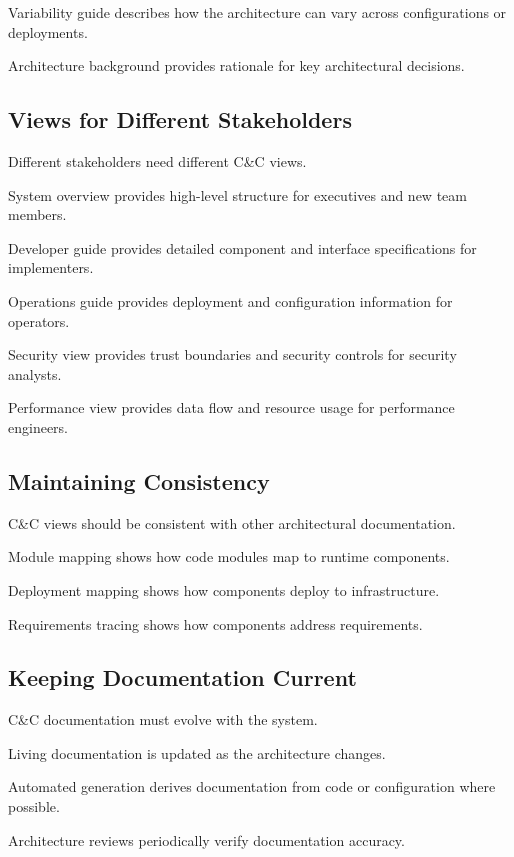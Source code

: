 \documentclass[11pt]{article}
\begin{document}
Variability guide describes how the architecture can vary across configurations or deployments.

Architecture background provides rationale for key architectural decisions.

\subsection{Views for Different Stakeholders}

Different stakeholders need different C\&C views.

System overview provides high-level structure for executives and new team members.

Developer guide provides detailed component and interface specifications for implementers.

Operations guide provides deployment and configuration information for operators.

Security view provides trust boundaries and security controls for security analysts.

Performance view provides data flow and resource usage for performance engineers.

\subsection{Maintaining Consistency}

C\&C views should be consistent with other architectural documentation.

Module mapping shows how code modules map to runtime components.

Deployment mapping shows how components deploy to infrastructure.

Requirements tracing shows how components address requirements.

\subsection{Keeping Documentation Current}

C\&C documentation must evolve with the system.

Living documentation is updated as the architecture changes.

Automated generation derives documentation from code or configuration where possible.

Architecture reviews periodically verify documentation accuracy.

\end{document}
